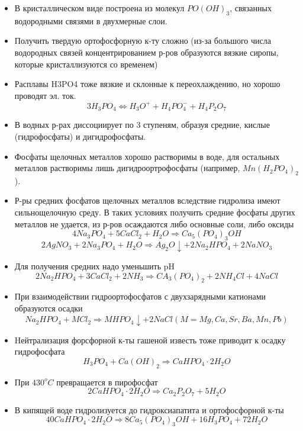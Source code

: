 \documentclass[11pt]{article}
\begin{document}
\begin{itemize}

\item В кристаллическом виде построена из молекул $PO(OH)_3$, связанных водородными связями в двухмерные слои. 
\item Получить твердую ортофосфорную к-ту сложно (из-за большого числа водородных связей концентрированием р-ров образуются вязкие сиропы, которые кристаллизуются со временем)
\item Расплавы H3PO4 тоже вязкие и склонные к переохлаждению, но хорошо проводят эл. ток. 
$$3 H_3PO_4 \Leftrightarrow H_3O^+ + H_4PO_4^- + H_4P_2O_7$$ 

\item В водных р-рах диссоциирует по 3 ступеням, образуя средние, кислые (гидрофосфаты) и дигидрофосфаты. 

\item Фосфаты щелочных металлов хорошо растворимы в воде, для остальных металлов растворимы лишь дигидроортрофосфаты (например, $Mn(H_2PO_4)_2$).

\item Р-ры средних фосфатов щелочных металлов вследствие гидролиза имеют сильнощелочную среду. В таких условиях получить средние фосфаты других металлов не удается, из р-ров осаждаются либо основные соли, либо оксиды
$$4Na_3PO_4 + 5CaCl_2 + H_2O \Rightarrow Ca_5(PO_4)_3OH$$
$$2AgNO_3 + 2Na_3PO_4 +H_2O \Rightarrow Ag_2O \downarrow + 2Na_2HPO_4 + 2NaNO_3$$

\item Для получения средних надо уменьшить pH
$$2Na_2HPO_4 + 3CaCl_2 + 2NH_3 \Rightarrow CA_3(PO_4)_2 + 2NH_4Cl + 4NaCl$$

\item При взаимодействии гидроортофосфатов с двухзарядными катионами образуются осадки
$$Na_2HPO_4 + MCl_2 \Rightarrow MHPO_4 \downarrow + 2NaCl(M = Mg, Ca, Sr, Ba, Mn, Pb)$$

\item Hейтрализация форсфорной к-ты гашеной известь тоже приводит к осадку гидрофосфата
$$H_3PO_4 + Ca(OH)_2 \Rightarrow CaHPO_4 \cdot 2H_2O$$

\item При $430^oC$ превращается в пирофосфат 
$$2 CaHPO_4\cdot 2H_2O \Rightarrow Ca_2P_2O_7 + 5H_2O$$

\item В кипящей воде гидролизуется до гидроксиапатита и ортофосфорной к-ты
$$40CaHPO_4 \cdot 2H_2O \Rightarrow 8 Ca_5(PO_4)_3OH + 16 H_3PO_4 + 72H_2O$$


\end{itemize}
\end{document}
